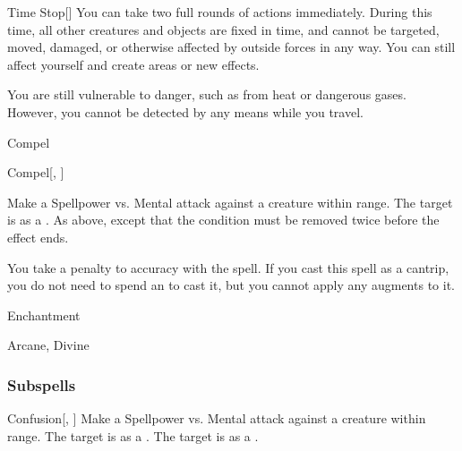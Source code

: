 \begin{ability}[\nth{9}]{Time Stop}[]
You can take two full rounds of actions immediately.
During this time, all other creatures and objects are fixed in time, and cannot be targeted, moved, damaged, or otherwise affected by outside forces in any way.
You can still affect yourself and create areas or new effects.

You are still vulnerable to danger, such as from heat or dangerous gases.
However, you cannot be detected by any means while you travel.
\end{ability}
\vspace{0.25em}

\newpage
\begin{spellsection}{Compel}

\begin{spellheader}
\end{spellheader}


\begin{ability}{Compel}[, ]

Make a Spellpower vs. Mental attack against a creature within \rngmed range.
\hit The target is \immobilized as a .
\crit As above, except that the condition must be removed twice before the effect ends.

\end{ability}



You take a  penalty to accuracy with the spell.
If you cast this spell as a cantrip,
you do not need to spend an  to cast it,
but you cannot apply any augments to it.


 Enchantment

 Arcane, Divine
\end{spellsection}


\subsubsection{Subspells}


\begin{ability}[\nth{2}]{Confusion}[, ]
Make a Spellpower vs. Mental attack against a creature within \rngmed range.
\hit The target is \disoriented as a .
\crit The target is \confused as a .
\end{ability}
\vspace{0.25em}


